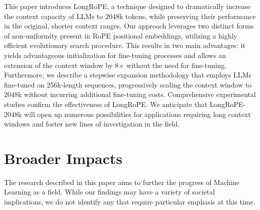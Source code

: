 This paper introduces LongRoPE, a technique designed to dramatically increase the context capacity of LLMs to 2048k tokens, while preserving their performance in the original, shorter context ranges. Our approach leverages two distinct forms of non-uniformity present in RoPE positional embeddings, utilizing a highly efficient evolutionary search procedure. This results in two main advantages: it yields advantageous initialization for fine-tuning processes and allows an extension of the context window by 8$\times$ without the need for fine-tuning. Furthermore, we describe a stepwise expansion methodology that employs LLMs fine-tuned on 256k-length sequences, progressively scaling the context window to 2048k without incurring additional fine-tuning costs. Comprehensive experimental studies confirm the effectiveness of LongRoPE. We anticipate that LongRoPE-2048k will open up numerous possibilities for applications requiring long context windows and foster new lines of investigation in the field.

\section*{Broader Impacts} The research described in this paper aims to further the progress of Machine Learning as a field. While our findings may have a variety of societal implications, we do not identify any that require particular emphasis at this time.

	\balance

